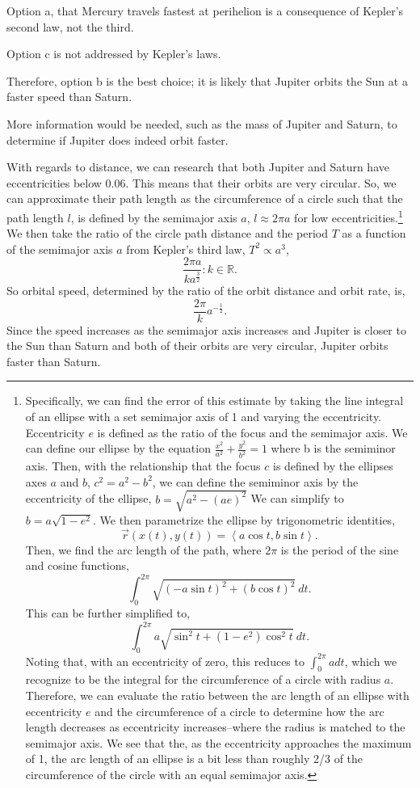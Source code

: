 \documentclass{article}
\begin{document}
\begin{enumerate}[start=9]
    Option a, that Mercury travels fastest at perihelion is a consequence of Kepler’s second law, not the third.

    Option c is not addressed by Kepler’s laws.

    Therefore, option b is the best choice; it is likely that Jupiter orbits the Sun at a faster speed than Saturn.
    
    More information would be needed, such as the mass of Jupiter and Saturn, to determine if Jupiter does indeed orbit faster.

    With regards to distance, we can research that both Jupiter and Saturn have eccentricities below 0.06. This means that their orbits are very circular. So, we can approximate their path length as the circumference of a circle such that the path length $l$, is defined by the semimajor axis $a$, $l \approx 2\pi a$ for low eccentricities.\footnote{Specifically, we can find the error of this estimate by taking the line integral of an ellipse with a set semimajor axis of 1 and varying the eccentricity. Eccentricity $e$ is defined as the ratio of the focus and the semimajor axis. We can define our ellipse by the equation $\frac{x^2}{a^2}+\frac{y^2}{b^2}=1$ where b is the semiminor axis. Then, with the relationship that the focus $c$ is defined by the ellipses axes $a$ and $b$, $c^2 = a^2 - b^2$, we can define the semiminor axis by the eccentricity of the ellipse, $b = \sqrt{a^2 - {(ae)}^2}$ We can simplify to $b = a\sqrt{1-e^2}$. We then parametrize the ellipse by trigonometric identities, \[\vec{r}(x(t),y(t)) = \left< a\cos{t}, b\sin{t} \right>.\] Then, we find the arc length of the path, where $2\pi$ is the period of the sine and cosine functions, \[\int_{0}^{2\pi} \sqrt{{(-a\sin{t})}^2 + {(b\cos{t})}^2} \ dt.\] This can be further simplified to, \[\int_{0}^{2\pi} a \sqrt{\sin^2{t} + (1-e^2)\cos^2{t}} \ dt.\] Noting that, with an eccentricity of zero, this reduces to $\int_{0}^{2\pi} a dt$, which we recognize to be the integral for the circumference of a circle with radius $a$. Therefore, we can evaluate the ratio between the arc length of an ellipse with eccentricity $e$ and the circumference of a circle to determine how the arc length decreases as eccentricity increases--where the radius is matched to the semimajor axis. We see that the, as the eccentricity approaches the maximum of 1, the arc length of an ellipse is a bit less than roughly 2/3 of the circumference of the circle with an equal semimajor axis.}
    We then take the ratio of the circle path distance and the period $T$ as a function of the semimajor axis $a$ from Kepler’s third law, $T^2 \propto a^3$, \[\frac{2\pi a}{ka^{\frac{3}{2}}} : k \in \mathbb{R}.\]
    So orbital speed, determined by the ratio of the orbit distance and orbit rate, is, \[\frac{2\pi}{k} a^{-\frac{1}{2}}.\]
    Since the speed increases as the semimajor axis increases and Jupiter is closer to the Sun than Saturn and both of their orbits are very circular, Jupiter orbits faster than Saturn.



\end{enumerate}
\end{document}
